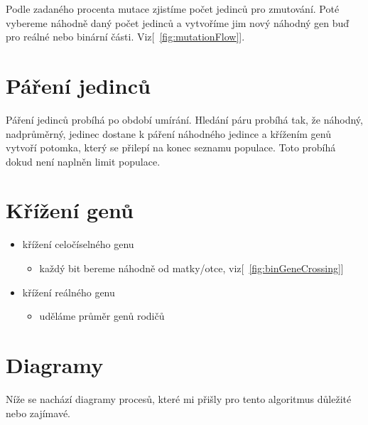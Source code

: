 \documentclass{article}
\begin{document}
Podle zadaného procenta mutace zjistíme počet jedinců pro zmutování. Poté vybereme náhodně daný počet jedinců a vytvoříme jim nový náhodný gen buď pro reálné nebo binární části. Viz[~\ref{fig:mutationFlow}].

\section{Páření jedinců}

Páření jedinců probíhá po období umírání. Hledání páru probíhá tak, \newline že náhodný, nadprůměrný, jedinec dostane k páření náhodného jedince \newline a křížením genů vytvoří potomka, který se přilepí na konec seznamu populace. Toto probíhá dokud není naplněn limit populace.

\section{Křížení genů}
\begin{itemize}
\item křížení celočíselného genu
\begin{itemize}
\item každý bit bereme náhodně od matky/otce, viz[~\ref{fig:binGeneCrossing}]
\end{itemize}
\item křížení reálného genu
\begin{itemize}
\item uděláme průměr genů rodičů
\end{itemize}
\end{itemize}

\section{Diagramy}

Níže se nachází diagramy procesů, které mi přišly pro tento algoritmus důležité nebo zajímavé.
\end{document}
